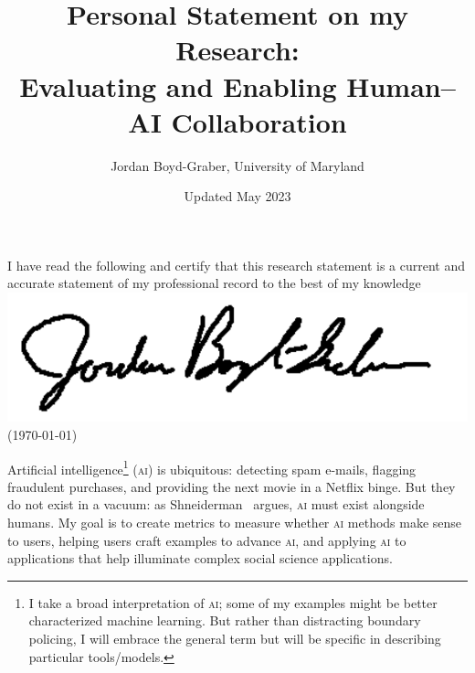 \usepackage{graphicx}
\usepackage{amssymb}
\usepackage{mfirstuc}
\usepackage{colortbl}
\usepackage{epstopdf}
\usepackage{url}

\newcommand{\abr}[1]{\textsc{#1}}
\newcommand{\newcite}[2]{\capitalisewords{#1} et al.~\cite{#1-#2}}



\newcommand{\student}[1]{\vspace{.5cm}\fbox{\parbox{0.95\linewidth}{{\small
        #1}}}\vspace{.5cm}}
\providecommand{\blue}[1]{{\color{blue}{#1}}}
\providecommand{\red}[1]{{\color{red}{#1}}}
\providecommand{\green}[1]{{\color{green}{#1}}}



 \title{Personal Statement on my Research: \\ Evaluating and Enabling Human--AI Collaboration}

 \author{Jordan Boyd-Graber, University of Maryland}


\date{Updated May 2023}

\maketitle

\ifumd
\vspace{.2cm}
  \parbox{\linewidth}{I have read the following and certify that this
  research statement is a current and accurate statement of my
  professional record to the best of my
  knowledge \flushright  \includegraphics[width=.2\linewidth]{resume_src/signature} \\
\flushright  (\today{})}
\vspace{.5cm}
\fi


Artificial intelligence\footnote{I take a broad interpretation of
\abr{ai}; some of my examples might be better characterized machine
learning.  But rather than distracting boundary policing, I will embrace
the general term but will be specific in describing particular tools/models.}
(\abr{ai}) is ubiquitous: detecting spam e-mails, flagging fraudulent
purchases, and providing the next movie in a Netflix binge.
%
But they do not exist in a vacuum: as
Shneiderman~\cite{shneiderman-21} argues, \abr{ai} must exist
alongside humans.
%
My goal is to create metrics to measure whether \abr{ai} methods make
sense to users, helping users craft examples to advance \abr{ai}, and
applying \abr{ai} to applications that help illuminate complex social
science applications.


